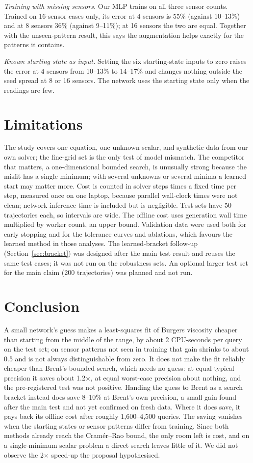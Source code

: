 \emph{Training with missing sensors.} Our MLP trains on all three sensor counts. Trained on 16-sensor cases
only, its error at 4 sensors is 55\% (against 10--13\%) and at 8 sensors 36\% (against 9--11\%); at 16
sensors the two are equal. Together with the unseen-pattern result, this says the augmentation helps exactly
for the patterns it contains.

\emph{Known starting state as input.} Setting the six starting-state inputs to zero raises the error at 4
sensors from 10--13\% to 14--17\% and changes nothing outside the seed spread at 8 or 16 sensors. The network
uses the starting state only when the readings are few.

\section{Limitations}
The study covers one equation, one unknown scalar, and synthetic data from our own solver; the fine-grid set
is the only test of model mismatch. The competitor that matters, a one-dimensional bounded search, is
unusually strong because the misfit has a single minimum; with several unknowns or several minima a learned
start may matter more. Cost is counted in solver steps times a fixed time per step, measured once on one
laptop, because parallel wall-clock times were not clean; network inference time is included but is
negligible. Test sets have 50 trajectories each, so intervals are wide. The offline cost uses generation wall
time multiplied by worker count, an upper bound. Validation data were used both for early stopping and for
the tolerance curves and ablations, which favours the learned method in those analyses. The learned-bracket
follow-up (Section~\ref{sec:bracket}) was designed after the main test result and reuses the same test cases;
it was not run on the robustness sets. An optional larger
test set for the main claim (200 trajectories) was planned and not run.

\section{Conclusion}
A small network's guess makes a least-squares fit of Burgers viscosity cheaper than starting from the middle
of the range, by about 2 CPU-seconds per query on the test set; on sensor patterns not seen in training that
gain shrinks to about 0.5 and is not always distinguishable from zero. It does not make the fit reliably
cheaper than Brent's bounded search, which needs no guess: at equal typical precision it saves about
1.2$\times$, at equal worst-case precision about nothing, and the pre-registered test was not positive.
Handing the guess to Brent as a search bracket instead does save 8--10\% at Brent's own precision, a small
gain found after the main test and not yet confirmed on fresh data. Where
it does save, it pays back its offline cost after roughly 1{,}600--4{,}500 queries. The saving vanishes when
the starting states or sensor patterns differ from training. Since both methods already reach the
Cram\'er--Rao bound, the only room left is cost, and on a single-minimum scalar problem a direct search
leaves little of it. We did not observe the 2$\times$ speed-up the proposal hypothesised.

